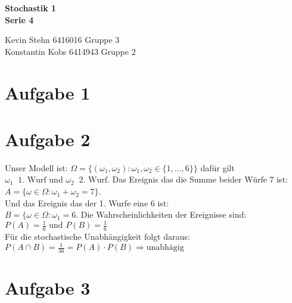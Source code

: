 \documentclass[10pt,a4paper]{article}
\newcommand{\ent}{\mathop{\widehat{=}}}
\newcommand{\w}{\omega}
\begin{document}
\begin{center}
\textbf{Stochastik 1 \\ Serie 4 \\}
\end{center}

\begin{flushright}
Kevin Stehn 6416016 Gruppe 3 \\
Konstantin Kobs 6414943 Gruppe 2
\end{flushright}

\section*{Aufgabe 1}

\section*{Aufgabe 2}
Unser Modell ist: $\Omega = \{(\w_1,\w_2) : \w_1,\w_2 \in \{1,...,6\} \}$ daf\"ur gilt\\
$\omega_1 \ent \text{1. Wurf}$ und $\w_2 \ent \text{2. Wurf}$.
Das Ereignis das die Summe beider W\"urfe 7 ist:\\
$A = \{\w \in \Omega : \w_1 + \w_2 = 7 \}$.\\
Und das Ereignis das der 1. Wurfe eine 6 ist:\\
$B = \{\w \in \Omega : \w_1 = 6$.
Die Wahrscheinlichkeiten der Ereignisse sind:\\
$P(A) = \frac{1}{6} \text{ und } P(B) = \frac{1}{6}$ \\
F\"ur die stochastische Unabh\"angigkeit folgt daraus:\\
$P(A \cap B) = \frac{1}{36} = P(A) \cdot P(B) \Rightarrow \text{unabh\"agig}$

\section*{Aufgabe 3}
\end{document}
